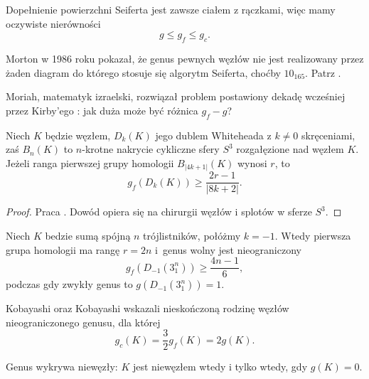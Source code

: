 Dopełnienie powierzchni Seiferta jest zawsze ciałem z rączkami, więc mamy oczywiste nierówności
\begin{equation}
    g \le g_f \le g_c.
\end{equation}

Morton w 1986 roku pokazał, że genus pewnych węzłów nie jest realizowany przez żaden diagram do którego stosuje się algorytm Seiferta, choćby $10_{165}$.
Patrz \cite{morton86}.

Moriah, matematyk izraelski, rozwiązał problem postawiony dekadę wcześniej przez Kirby'ego \cite{kirby78}: jak duża może być różnica $g_f - g$?

\begin{proposition}
    Niech $K$ będzie węzłem, $D_k(K)$ jego dublem Whiteheada z $k \neq 0$ skręceniami, zaś $B_n(K)$ to $n$-krotne nakrycie cykliczne sfery $S^3$ rozgałęzione nad węzłem $K$.
    Jeżeli ranga pierwszej grupy homologii $B_{|4k+1|}(K)$ wynosi $r$, to
    \begin{equation}
        g_f(D_k(K)) \ge \frac {2r-1} {|8k+2|}.
    \end{equation}
\end{proposition}

\begin{proof}
    Praca \cite{moriah87}.
    Dowód opiera się na chirurgii węzłów i splotów w sferze $S^3$.
\end{proof}

\begin{corollary}
    Niech $K$ bedzie sumą spójną $n$ trójlistników, połóżmy $k = -1$.
    Wtedy pierwsza grupa homologii ma rangę $r = 2n$ i~genus wolny jest nieograniczony
    \begin{equation}
        g_f(D_{-1}(3_1^n)) \ge \frac {4n-1} {6},
    \end{equation}
    podczas gdy zwykły genus to $g(D_{-1}(3_1^n)) = 1$.
\end{corollary}

Kobayashi oraz Kobayashi \cite{kobayashi96} wskazali nieskończoną rodzinę węzłów nieograniczonego genusu, dla której
\begin{equation}
    g_c(K) = \frac 32 g_f(K) = 2g(K).
\end{equation}

\begin{proposition}
    \label{prp:genus_detects_unknot}
    Genus wykrywa niewęzły: $K$ jest niewęzłem wtedy i tylko wtedy, gdy $g(K) = 0$.
\end{proposition}

